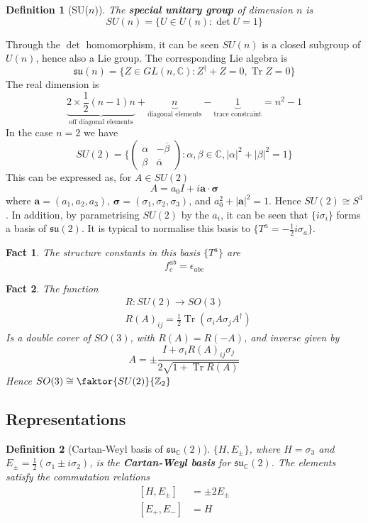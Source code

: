 \documentclass{article}
\newtheorem{definition}{Definition}[subsection]
\newtheorem{fact}{Fact}[subsection]
\DeclareMathOperator{\tr}{Tr}
\newcommand{\bam}[1]{\textbf{#1}}
\newcommand{\mf}[1]{\mathfrak{#1}}
\newcommand{\mbb}[1]{\mathbb{#1}}
\newcommand{\comm}[2][]{\left[ #1, #2 \right]}
\begin{document}
\begin{definition}[SU($n$)]
The \bam{special unitary group} of dimension $n$ is
\[
SU\left(n\right)=\lbrace U\in U(n) : \det{U}=1 \rbrace
\]
\end{definition}
\noindent Through the $\det$ homomorphism, it can be seen $SU(n)$ is a closed subgroup of $U(n)$, hence also a Lie group.  The corresponding Lie algebra is 
\[
\mf{su}\left(n\right)=\lbrace Z\in GL\left(n,\mbb{C}\right) : Z^\dagger+Z=0, \tr{Z}=0 \rbrace
\]
The real dimension is
\[
\underbrace{2\times\frac{1}{2}(n-1)n}_{\text{off diagonal elements}}+\underbrace{n}_{\text{diagonal elements}}-\underbrace{1}_{\text{trace constraint}}=n^2-1
\]
In the case $n=2$ we have 
\[
SU(2)=\lbrace   \begin{pmatrix} \alpha & -\overline{\beta} \\ \beta & \overline{\alpha} \end{pmatrix}  : \alpha,\beta\in\mathbb{C} , |\alpha|^2+|\beta|^2=1  \rbrace
\]
This can be expressed as, for $A\in SU(2)$
\[
A=a_0 I +i\bm{a}\cdot\bm{\sigma}
\]
where $\bm{a}=(a_1, a_2, a_3)$, $\bm{\sigma}=(\sigma_1, \sigma_2, \sigma_3)$, and $a_0^2+|\bm{a}|^2=1$. Hence $SU(2)\cong S^3$. In addition, by parametrising $SU(2)$ by the $a_i$, it can be seen that $\lbrace i\sigma_i\rbrace$ forms a basis of $\mf{su}(2)$. It is typical to normalise this basis to $\lbrace T^a=-\frac{1}{2} i\sigma_a \rbrace$. 

\begin{fact}
The structure constants in this basis $\lbrace T^a \rbrace$ are 
\[
f^{ab}_c=\epsilon_{abc}
\]
\end{fact}

\begin{fact}
The function 
\begin{align*}
     & R : SU(2) \to SO(3) \\
     & R(A)_{ij} = \frac{1}{2}\tr\left( \sigma_i A \sigma_j A^\dagger \right)
\end{align*}
Is a double cover of $SO(3)$, with $R(A)=R(-A)$, and inverse given by 
\[
A=\pm \frac{I+\sigma_i R(A)_{ij} \sigma_j}{2\sqrt{1+\tr R(A)}}
\]
Hence $SO(3)\cong\faktor{SU(2)}{\mbb{Z}_2}$
\end{fact}

\subsection{Representations}

\begin{definition}[Cartan-Weyl basis of $\mf{su}_\mbb{C}(2)$]
$\lbrace H, E_\pm \rbrace$, where $H=\sigma_3$ and $E_\pm=\frac{1}{2}(\sigma_1\pm i\sigma_2 )$, is the \bam{Cartan-Weyl basis} for $\mf{su}_\mbb{C}(2)$. The elements satisfy the commutation relations 
\begin{align*}
\comm[H]{E_\pm} &= \pm 2E_\pm \\
\comm[E_+]{E_-} &= H
\end{align*}
\end{definition} 
\end{document}

